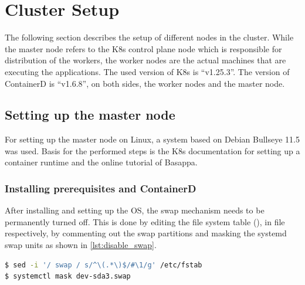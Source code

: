 

\section{Cluster Setup}
The following section describes the setup of different nodes in the cluster. While the master node refers to the \ac{K8s} control plane node which is responsible for distribution of the workers, the worker nodes are the actual machines that are executing the applications.
The used version of \ac{K8s} is \enquote{v1.25.3}. The version of ContainerD is \enquote{v1.6.8}, on both sides, the worker nodes and the master node.

\subsection{Setting up the master node}
For setting up the master node on Linux, a system based on Debian Bullseye 11.5 was used. Basis for the performed steps is the \ac{K8s} documentation for setting up a container runtime\cite{Kubernetes.2019} and the online tutorial of Basappa\cite{Basappa.2022}.

\subsubsection{Installing prerequisites and ContainerD}
After installing and setting up the \ac{OS}, the swap mechanism needs to be permanently turned off. This is done by editing the file system table (), in file  respectively, by commenting out the swap partitions and masking the systemd swap units as shown in \autoref{lst:disable_swap}.
\begin{lstlisting}[label=lst:disable_swap, caption={Bash commands for disabling Swap mechanism and masking.}, language=bash]
$ sed -i '/ swap / s/^\(.*\)$/#\1/g' /etc/fstab
$ systemctl mask dev-sda3.swap
\end{lstlisting}

